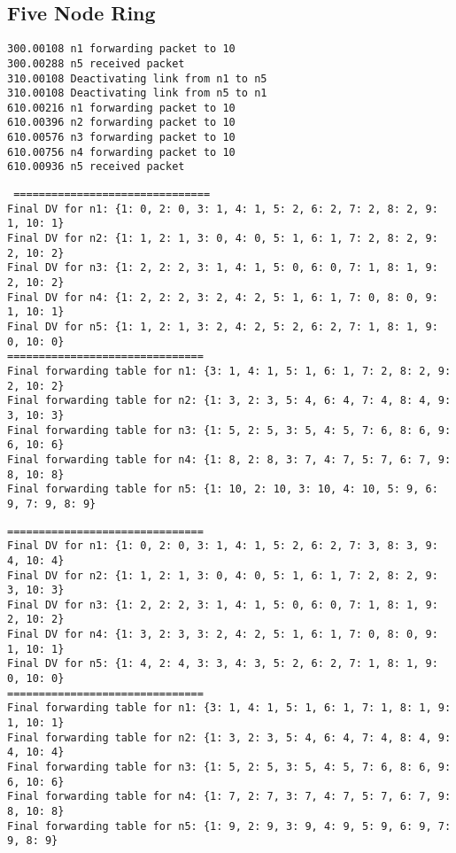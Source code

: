 \documentclass[11pt]{article}
\begin{document}
\subsection{Five Node Ring}

 \begin{lstlisting} 
300.00108 n1 forwarding packet to 10
300.00288 n5 received packet
310.00108 Deactivating link from n1 to n5
310.00108 Deactivating link from n5 to n1
610.00216 n1 forwarding packet to 10
610.00396 n2 forwarding packet to 10
610.00576 n3 forwarding packet to 10
610.00756 n4 forwarding packet to 10
610.00936 n5 received packet
\end{lstlisting}

 \begin{lstlisting} 
 ===============================
Final DV for n1: {1: 0, 2: 0, 3: 1, 4: 1, 5: 2, 6: 2, 7: 2, 8: 2, 9: 1, 10: 1}
Final DV for n2: {1: 1, 2: 1, 3: 0, 4: 0, 5: 1, 6: 1, 7: 2, 8: 2, 9: 2, 10: 2}
Final DV for n3: {1: 2, 2: 2, 3: 1, 4: 1, 5: 0, 6: 0, 7: 1, 8: 1, 9: 2, 10: 2}
Final DV for n4: {1: 2, 2: 2, 3: 2, 4: 2, 5: 1, 6: 1, 7: 0, 8: 0, 9: 1, 10: 1}
Final DV for n5: {1: 1, 2: 1, 3: 2, 4: 2, 5: 2, 6: 2, 7: 1, 8: 1, 9: 0, 10: 0}
===============================
Final forwarding table for n1: {3: 1, 4: 1, 5: 1, 6: 1, 7: 2, 8: 2, 9: 2, 10: 2}
Final forwarding table for n2: {1: 3, 2: 3, 5: 4, 6: 4, 7: 4, 8: 4, 9: 3, 10: 3}
Final forwarding table for n3: {1: 5, 2: 5, 3: 5, 4: 5, 7: 6, 8: 6, 9: 6, 10: 6}
Final forwarding table for n4: {1: 8, 2: 8, 3: 7, 4: 7, 5: 7, 6: 7, 9: 8, 10: 8}
Final forwarding table for n5: {1: 10, 2: 10, 3: 10, 4: 10, 5: 9, 6: 9, 7: 9, 8: 9}
\end{lstlisting}

 \begin{lstlisting} 
===============================
Final DV for n1: {1: 0, 2: 0, 3: 1, 4: 1, 5: 2, 6: 2, 7: 3, 8: 3, 9: 4, 10: 4}
Final DV for n2: {1: 1, 2: 1, 3: 0, 4: 0, 5: 1, 6: 1, 7: 2, 8: 2, 9: 3, 10: 3}
Final DV for n3: {1: 2, 2: 2, 3: 1, 4: 1, 5: 0, 6: 0, 7: 1, 8: 1, 9: 2, 10: 2}
Final DV for n4: {1: 3, 2: 3, 3: 2, 4: 2, 5: 1, 6: 1, 7: 0, 8: 0, 9: 1, 10: 1}
Final DV for n5: {1: 4, 2: 4, 3: 3, 4: 3, 5: 2, 6: 2, 7: 1, 8: 1, 9: 0, 10: 0}
===============================
Final forwarding table for n1: {3: 1, 4: 1, 5: 1, 6: 1, 7: 1, 8: 1, 9: 1, 10: 1}
Final forwarding table for n2: {1: 3, 2: 3, 5: 4, 6: 4, 7: 4, 8: 4, 9: 4, 10: 4}
Final forwarding table for n3: {1: 5, 2: 5, 3: 5, 4: 5, 7: 6, 8: 6, 9: 6, 10: 6}
Final forwarding table for n4: {1: 7, 2: 7, 3: 7, 4: 7, 5: 7, 6: 7, 9: 8, 10: 8}
Final forwarding table for n5: {1: 9, 2: 9, 3: 9, 4: 9, 5: 9, 6: 9, 7: 9, 8: 9}
 \end{lstlisting}
 
\end{document}
